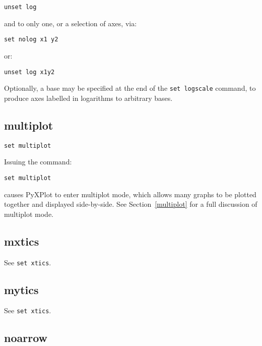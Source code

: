 \begin{verbatim}
unset log
\end{verbatim}

\noindent and to only one, or a selection of axes, via:

\begin{verbatim}
set nolog x1 y2
\end{verbatim}

\noindent or:

\begin{verbatim}
unset log x1y2
\end{verbatim}

Optionally, a base may be specified at the end of the {\tt set logscale}
command, to produce axes labelled in logarithms to arbitrary bases.

\subsection{multiplot}

\begin{verbatim}
set multiplot
\end{verbatim}

Issuing the command:

\begin{verbatim}
set multiplot
\end{verbatim}

\noindent causes PyXPlot to enter multiplot mode, which allows many graphs to
be plotted together and displayed side-by-side. See Section~\ref{multiplot} for
a full discussion of multiplot mode.

\subsection{mxtics}

See {\tt set xtics}.

\subsection{mytics}

See {\tt set xtics}.

\subsection{noarrow}


